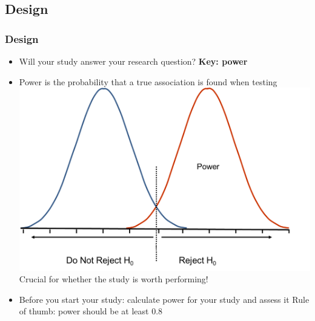 \documentclass[xcolor=pdftex,dvipsnames,table,10pt]{beamer}
\begin{document}
\subsection{Design}
\begin{frame}
  \frametitle{Design}
\small 
  \begin{itemize}
 \item<1-> Will your study answer your research question? \textbf{Key: power}
 \item<2-> Power is the probability that a true association is found when testing\\\vspace{0.3cm}\includegraphics[scale=.25]{RejectionRegion3b.png}\\\vspace{0.05cm}
Crucial for whether the study is worth performing!%
\item<3-> Before you start your study: calculate power for your study and assess it
 Rule of thumb: power should be at least 0.8 
    \end{itemize}
\end{frame}
\end{document}
